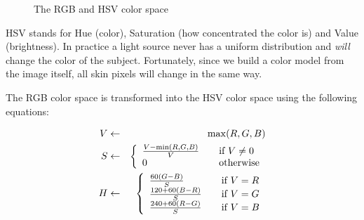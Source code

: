 \begin{figure}[tb]
  \centering
{}
\hspace{0.01\linewidth}
  \caption{The RGB and HSV color space}
  \label{fig:colorspaces}
\end{figure}

HSV stands for Hue (color), Saturation (how concentrated the color is) and Value (brightness). In practice a light source never has a uniform distribution and \emph{will} change the color of the subject. Fortunately, since we build a color model from the image itself, all skin pixels will change in the same way. 

The RGB color space is transformed into the HSV color space using the following equations:


\begin{eqnarray}
  V & \leftarrow & \max(R,G,B) \\
  S & \leftarrow & \left\{
  \begin{array}{l l}
    \frac{V-\min(R, G, B)}{V} & \quad \text{if $V \neq 0$} \\
    0 						  & \quad \text{otherwise} \\
  \end{array} \right.\\
  H & \leftarrow & \left\{
  \begin{array}{l l}
    \frac{60(G - B)}{S}     & \quad \text{if $V = R$} \\
    \frac{120 + 60(B-R)}{S} & \quad \text{if $V = G$} \\
    \frac{240 + 60(R-G)}{S} & \quad \text{if $V = B$} \\
  \end{array} \right.
\end{eqnarray}

